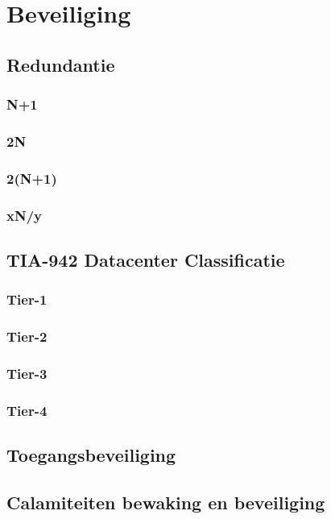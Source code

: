 \documentclass[a4paper,12pt,twoside,openright,titlepage]{book}
\begin{document}
\chapter{Beveiliging}
\section{Redundantie}

\subsection{N+1}

\subsection{2N}

\subsection{2(N+1)}

\subsection{xN/y}

\section{TIA-942 Datacenter Classificatie}

\subsection{Tier-1}

\subsection{Tier-2}

\subsection{Tier-3}

\subsection{Tier-4}

\section{Toegangsbeveiliging}

\section{Calamiteiten bewaking en beveiliging}


\end{document}
